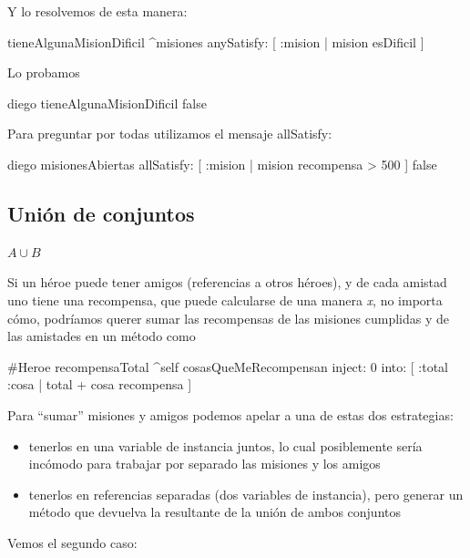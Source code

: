 \documentclass[a4paper,12pt]{book}
\begin{document}
Y lo resolvemos de esta manera:

\begin{code}
tieneAlgunaMisionDificil
      ^misiones anySatisfy: [ :mision | mision esDificil ] 
\end{code}

Lo probamos

\begin{code}
diego tieneAlgunaMisionDificil
    false
\end{code}

Para preguntar por todas utilizamos el mensaje allSatisfy:

\begin{code}
diego misionesAbiertas 
    allSatisfy: [ :mision | mision recompensa > 500 ]
    false
\end{code}

\subsection{Unión de conjuntos}

\begin{mdframed}[style=BoxFrame]
\( A \cup B \)
\end{mdframed}

Si un héroe puede tener amigos (referencias a otros héroes), y de cada amistad uno tiene una recompensa, que 
puede calcularse de una manera \textit{x}, no importa cómo, podríamos querer sumar las recompensas de las misiones
cumplidas y de las amistades en un método como

\begin{code}
#Heroe
recompensaTotal
   ^self cosasQueMeRecompensan 
            inject: 0
            into: [ :total :cosa | total + cosa recompensa ]
\end{code}

Para ``sumar'' misiones y amigos podemos apelar a una de estas dos estrategias:

\begin{itemize}
 \item tenerlos en una variable de instancia juntos, lo cual posiblemente sería incómodo para trabajar
 por separado las misiones y los amigos
 \item tenerlos en referencias separadas (dos variables de instancia), pero generar un método que devuelva
 la resultante de la unión de ambos conjuntos
\end{itemize}

Vemos el segundo caso:
\end{document}
